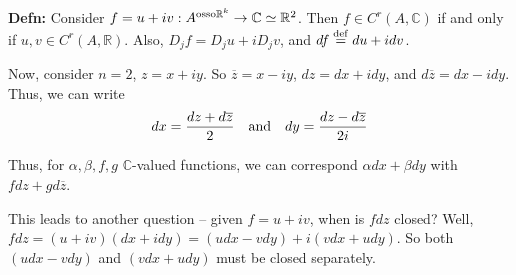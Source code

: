 \documentclass[10pt,letterpaper]{article}
\newcommand{\n}{\hfill\break}
\newcommand{\defn}[1]{\par\noindent\settowidth{\hangindent}{\textbf{Defn: }}\textbf{Defn: }#1\n}
\newcommand{\ptxt}[1]{\textrm{\textnormal{#1}}}
\newcommand{\reals}{\mathbb{R}}
\newcommand{\R}{\reals}
\newcommand{\complex}{\mathbb{C}}
\newcommand{\C}{\complex}
\newcommand{\conj}[1]{\overline{#1}}
\newcommand{\eqdef}{\overset{\ptxt{def}}{=}}
\begin{document}
\defn{Consider $f=u+iv:A^{\ptxt{osso}\R^{k}}\to\C\simeq\R^{2}$. Then $f\in{}C^{r}(A,\C)$ if and only if $u,v\in{}C^{r}(A,\R)$.\n
Also, $D_{j}f=D_{j}u+iD_{j}v$, and $df\eqdef{}du+idv$.}

\par\noindent Now, consider $n=2$, $z=x+iy$. So $\conj{z}=x-iy$, $dz=dx+idy$, and $d\conj{z}=dx-idy$. Thus, we can write
\[
dx=\frac{dz+d\conj{z}}{2}\quad\ptxt{and}\quad{}dy=\frac{dz-d\conj{z}}{2i}
\]

\par\noindent Thus, for $\alpha,\beta,f,g$ $\C$-valued functions, we can correspond $\alpha{}dx+\beta{}dy$ with $fdz+gd\conj{z}$.\n

\par\noindent This leads to another question -- given $f=u+iv$, when is $fdz$ closed?\n
Well, $fdz=(u+iv)(dx+idy)=(udx-vdy)+i(vdx+udy)$.\n
So both $(udx-vdy)$ and $(vdx+udy)$ must be closed separately.
\end{document}
